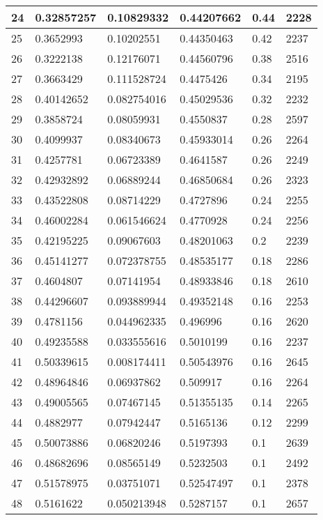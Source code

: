 \begin{longtable}{|l|l|l|l|l|l|}
24 & 0.32857257 & 0.10829332 & 0.44207662 & 0.44 & 2228 \\ \hline 
25 & 0.3652993 & 0.10202551 & 0.44350463 & 0.42 & 2237 \\ \hline 
26 & 0.3222138 & 0.12176071 & 0.44560796 & 0.38 & 2516 \\ \hline 
27 & 0.3663429 & 0.111528724 & 0.4475426 & 0.34 & 2195 \\ \hline 
28 & 0.40142652 & 0.082754016 & 0.45029536 & 0.32 & 2232 \\ \hline 
29 & 0.3858724 & 0.08059931 & 0.4550837 & 0.28 & 2597 \\ \hline 
30 & 0.4099937 & 0.08340673 & 0.45933014 & 0.26 & 2264 \\ \hline 
31 & 0.4257781 & 0.06723389 & 0.4641587 & 0.26 & 2249 \\ \hline 
32 & 0.42932892 & 0.06889244 & 0.46850684 & 0.26 & 2323 \\ \hline 
33 & 0.43522808 & 0.08714229 & 0.4727896 & 0.24 & 2255 \\ \hline 
34 & 0.46002284 & 0.061546624 & 0.4770928 & 0.24 & 2256 \\ \hline 
35 & 0.42195225 & 0.09067603 & 0.48201063 & 0.2 & 2239 \\ \hline 
36 & 0.45141277 & 0.072378755 & 0.48535177 & 0.18 & 2286 \\ \hline 
37 & 0.4604807 & 0.07141954 & 0.48933846 & 0.18 & 2610 \\ \hline 
38 & 0.44296607 & 0.093889944 & 0.49352148 & 0.16 & 2253 \\ \hline 
39 & 0.4781156 & 0.044962335 & 0.496996 & 0.16 & 2620 \\ \hline 
40 & 0.49235588 & 0.033555616 & 0.5010199 & 0.16 & 2237 \\ \hline 
41 & 0.50339615 & 0.008174411 & 0.50543976 & 0.16 & 2645 \\ \hline 
42 & 0.48964846 & 0.06937862 & 0.509917 & 0.16 & 2264 \\ \hline 
43 & 0.49005565 & 0.07467145 & 0.51355135 & 0.14 & 2265 \\ \hline 
44 & 0.4882977 & 0.07942447 & 0.5165136 & 0.12 & 2299 \\ \hline 
45 & 0.50073886 & 0.06820246 & 0.5197393 & 0.1 & 2639 \\ \hline 
46 & 0.48682696 & 0.08565149 & 0.5232503 & 0.1 & 2492 \\ \hline 
47 & 0.51578975 & 0.03751071 & 0.52547497 & 0.1 & 2378 \\ \hline 
48 & 0.5161622 & 0.050213948 & 0.5287157 & 0.1 & 2657 \\ \hline 

\end{longtable}

